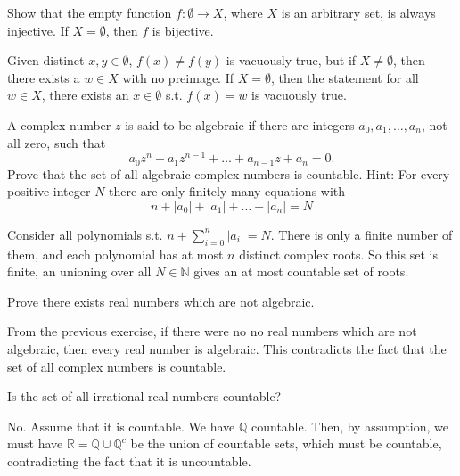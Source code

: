\documentclass{article}
\begin{document}
    \begin{exercise}
    Show that the empty function $f: \emptyset \rightarrow X$, where $X$ is an arbitrary set, is always injective. If $X = \emptyset$, then $f$ is bijective. 
    \end{exercise}
    \begin{solution}
    Given distinct $x, y \in \emptyset$, $f(x) \neq f(y)$ is vacuously true, but if $X \neq \emptyset$, then there exists a $w \in X$ with no preimage. If $X = \emptyset$, then the statement for all $w \in X$, there exists an $x \in \emptyset$ s.t. $f(x) = w$ is vacuously true. 
    \end{solution}

    \begin{exercise}[Rudin 2.2]
    A complex number $z$ is said to be algebraic if there are integers $a_0, a_1, \ldots, a_n$, not all zero, such that
    \[
    a_0z^n + a_1z^{n-1} + \ldots + a_{n-1}z + a_n = 0.
    \]
    Prove that the set of all algebraic complex numbers is countable. Hint: For every positive integer $N$ there are only finitely many equations with 
    \[n + |a_0| + |a_1| + \ldots + |a_n| = N\]
    \end{exercise}
    \begin{solution}
    Consider all polynomials s.t. $n + \sum_{i=0}^n |a_i| = N$. There is only a finite number of them, and each polynomial has at most $n$ distinct complex roots. So this set is finite, an unioning over all $N \in \mathbb{N}$ gives an at most countable set of roots. 
    \end{solution}

    \begin{exercise}[Rudin 2.3]
    Prove there exists real numbers which are not algebraic. 
    \end{exercise}
    \begin{solution}
    From the previous exercise, if there were no no real numbers which are not algebraic, then every real number is algebraic. This contradicts the fact that the set of all complex numbers is countable. 
    \end{solution}

    \begin{exercise}[Rudin 2.4]
    Is the set of all irrational real numbers countable? 
    \end{exercise}
    \begin{solution}
    No. Assume that it is countable. We have $\mathbb{Q}$ countable. Then, by assumption, we must have $\mathbb{R} = \mathbb{Q} \cup \mathbb{Q}^c$ be the union of countable sets, which must be countable, contradicting the fact that it is uncountable. 
    \end{solution}
\end{document}
